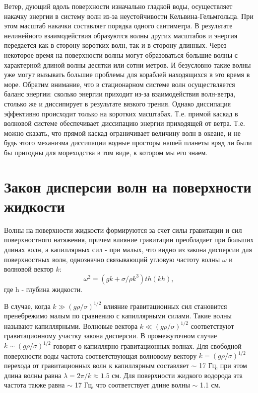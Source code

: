 Ветер, дующий вдоль поверхности изначально гладкой воды, осуществляет накачку энергии в систему волн из-за неустойчивости Кельвина-Гельмгольца. При этом масштаб накачки составляет порядка одного сантиметра. В результате нелинейного взаимодействия образуются волны других масштабов и энергия передается как в сторону коротких волн, так и в сторону длинных. Через некоторое время на поверхности волны могут образоваться большие волны с характерной длиной волны десятки или сотни метров. И безусловно такие волны уже могут вызывать большие проблемы для кораблей находящихся в это время в море. 
	Обратим внимание, что в стационарном системе волн осуществляется баланс энергии: сколько энергии приходит из-за взаимодействия волн-ветра, столько же и диссипирует в результате вязкого трения. Однако диссипация эффективно происходит только на коротких масштабах. Т.е. примой каскад в волновой системе обеспечивает диссипацию энергии приходящей от ветра. Т.е. можно сказать, что прямой каскад ограничивает величину волн в океане, и не будь этого механизма диссипации водные просторы нашей планеты вряд ли были бы пригодны для мореходства в том виде, к котором мы его знаем.


\section{Закон дисперсии волн на поверхности жидкости}%

Волны на поверхности жидкости формируются за счет силы гравитации и сил поверхностного натяжения, причем влияние гравитации преобладает при больших длинах волн, а капиллярных сил - при малых, что видно из закона дисперсии для поверхностных волн, однозначно связывающий угловую частоту волны $\omega$ и волновой вектор $k$:
\begin{equation}
 \label{eq:disper_dip}
\omega^2 = (gk + \sigma/\rho k^3)th(kh),
\end{equation}
где h - глубина жидкости.

В случае, когда $k \gg (g\rho/\sigma)^{1/2}$ влияние гравитационных сил становится пренебрежимо малым по сравнению 
с капиллярными силами. Такие волны называют капиллярными. Волновые вектора $k \ll (g\rho/\sigma)^{1/2}$ соответствуют гравитационному участку закона дисперсии. В промежуточном случае $k \sim (g\rho/\sigma)^{1/2}$ говорят о капиллярно-гравитационных волнах. Для свободной поверхности воды частота соответствующая волновому вектору $k = (g\rho/\sigma)^{1/2}$ перехода от гравитационных волн к капиллярным составляет $\sim$ 17 Гц, при этом длина волны равна $\lambda = 2\pi/k \approx 1.5$ см. Для поверхности жидкого водорода эта частота также равна $\sim$ 17 Гц, что соответствует длине волны $\sim$ 1.1 см.


